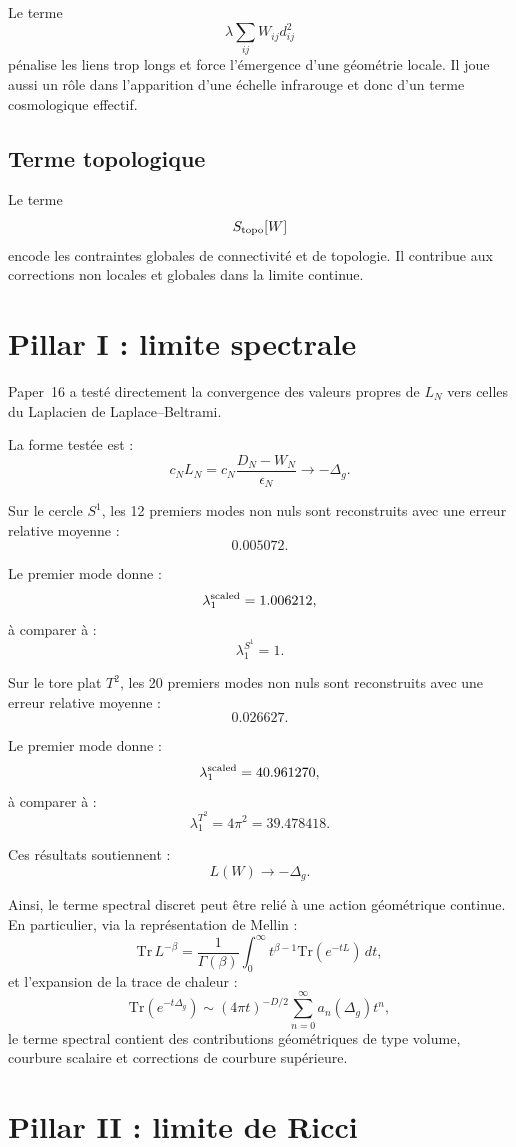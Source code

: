 \documentclass[11pt,a4paper]{article}
\begin{document}
Le terme
\[
\lambda\sum_{ij}W_{ij}d_{ij}^{2}
\]
pénalise les liens trop longs et force l'émergence d'une géométrie locale. Il
joue aussi un rôle dans l'apparition d'une échelle infrarouge et donc d'un
terme cosmologique effectif.

\subsection{Terme topologique}

Le terme
\[
S_{\rm topo}[W]
\]
encode les contraintes globales de connectivité et de topologie. Il contribue
aux corrections non locales et globales dans la limite continue.

\section{Pillar I : limite spectrale}

Paper~16 a testé directement la convergence des valeurs propres de \(L_N\)
vers celles du Laplacien de Laplace--Beltrami.

La forme testée est :
\[
c_NL_N
=
c_N\frac{D_N-W_N}{\epsilon_N}
\longrightarrow
-\Delta_g.
\]

Sur le cercle \(S^1\), les 12 premiers modes non nuls sont reconstruits avec
une erreur relative moyenne :
\[
0.005072.
\]

Le premier mode donne :
\[
\lambda_1^{\rm scaled}=1.006212,
\]
à comparer à :
\[
\lambda_1^{S^1}=1.
\]

Sur le tore plat \(T^2\), les 20 premiers modes non nuls sont reconstruits
avec une erreur relative moyenne :
\[
0.026627.
\]

Le premier mode donne :
\[
\lambda_1^{\rm scaled}=40.961270,
\]
à comparer à :
\[
\lambda_1^{T^2}=4\pi^2=39.478418.
\]

Ces résultats soutiennent :
\[
L(W)\to-\Delta_g.
\]

Ainsi, le terme spectral discret peut être relié à une action géométrique
continue. En particulier, via la représentation de Mellin :
\[
\mathrm{Tr}\,L^{-\beta}
=
\frac{1}{\Gamma(\beta)}
\int_0^\infty
t^{\beta-1}
\mathrm{Tr}(e^{-tL})\,dt,
\]
et l'expansion de la trace de chaleur :
\[
\mathrm{Tr}(e^{-t\Delta_g})
\sim
(4\pi t)^{-D/2}
\sum_{n=0}^{\infty}a_n(\Delta_g)t^n,
\]
le terme spectral contient des contributions géométriques de type volume,
courbure scalaire et corrections de courbure supérieure.

\section{Pillar II : limite de Ricci}
\end{document}
